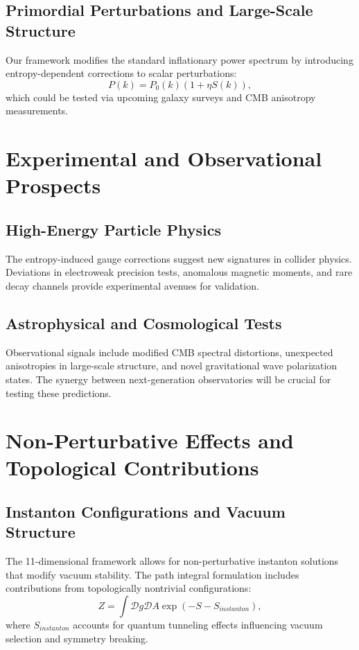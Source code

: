 \documentclass{article}
\begin{document}
\subsection{Primordial Perturbations and Large-Scale Structure}
Our framework modifies the standard inflationary power spectrum by introducing entropy-dependent corrections to scalar perturbations:
\begin{equation}
P(k) = P_0(k) \left( 1 + \eta S(k) \right),
\end{equation}
which could be tested via upcoming galaxy surveys and CMB anisotropy measurements.

\section{Experimental and Observational Prospects}

\subsection{High-Energy Particle Physics}
The entropy-induced gauge corrections suggest new signatures in collider physics. Deviations in electroweak precision tests, anomalous magnetic moments, and rare decay channels provide experimental avenues for validation.

\subsection{Astrophysical and Cosmological Tests}
Observational signals include modified CMB spectral distortions, unexpected anisotropies in large-scale structure, and novel gravitational wave polarization states. The synergy between next-generation observatories will be crucial for testing these predictions.

\section{Non-Perturbative Effects and Topological Contributions}

\subsection{Instanton Configurations and Vacuum Structure}
The 11-dimensional framework allows for non-perturbative instanton solutions that modify vacuum stability. The path integral formulation includes contributions from topologically nontrivial configurations:
\begin{equation}
Z = \int \mathcal{D}g \mathcal{D}A \exp\left( -S - S_{instanton} \right),
\end{equation}
where $S_{instanton}$ accounts for quantum tunneling effects influencing vacuum selection and symmetry breaking.
\end{document}
